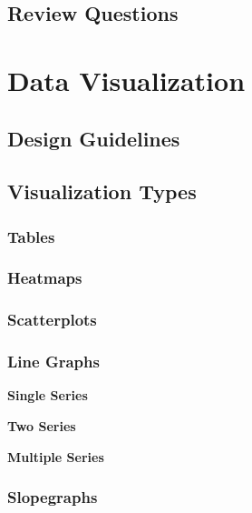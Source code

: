 \documentclass[]{book}
\begin{document}
\hypertarget{review-questions-12}{%
\section{Review Questions}\label{review-questions-12}}

\hypertarget{data-viz}{%
\chapter{Data Visualization}\label{data-viz}}

\hypertarget{design-guidelines}{%
\section{Design Guidelines}\label{design-guidelines}}

\hypertarget{visualization-types}{%
\section{Visualization Types}\label{visualization-types}}

\hypertarget{tables}{%
\subsection{Tables}\label{tables}}

\hypertarget{heatmaps}{%
\subsection{Heatmaps}\label{heatmaps}}

\hypertarget{scatterplots}{%
\subsection{Scatterplots}\label{scatterplots}}

\hypertarget{line-graphs}{%
\subsection{Line Graphs}\label{line-graphs}}

\textbf{Single Series}

\textbf{Two Series}

\textbf{Multiple Series}

\hypertarget{slopegraphs}{%
\subsection{Slopegraphs}\label{slopegraphs}}
\end{document}
